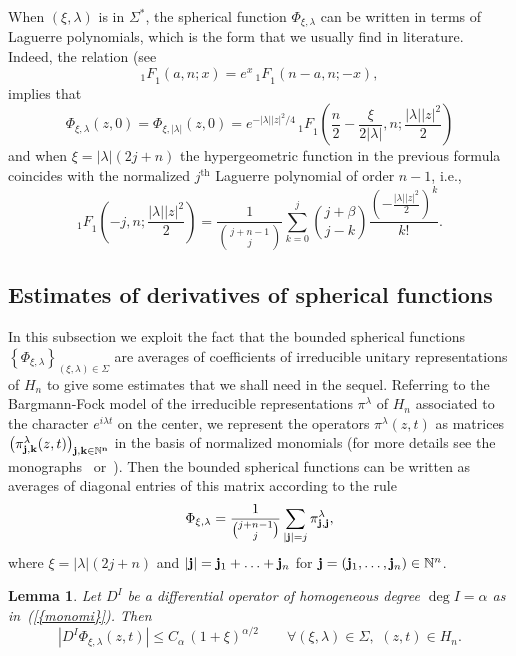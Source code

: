 \documentclass[12pt,a4paper]{amsart}
\theoremstyle{plain}
\newtheorem{lemma}[theorem]{Lemma}
\theoremstyle{definition}
\numberwithin{equation}{section}
\begin{document}
When $(\xi,{\lambda})$ is in ${{\Sigma^*}}$, the spherical function
$\Phi_{\xi,{\lambda}}$ can be written 
in terms of Laguerre polynomials, which is the form that we usually find in literature.
Indeed,  
the relation (see \cite[p.~253, formula~(7)]{E}
\begin{equation}\label{lebedev}
{ {_{1} F}_{\!1}}(a,{n};x)=e^x\, { {_{1} F}_{\!1}}({n}-a, {n};-x),
 \end{equation} 
implies that 
$$
\Phi_{\xi,{\lambda}}(z,0)
=\Phi_{\xi,|{\lambda}|}(z,0)=
e^{-|{\lambda}| |z|^2/4}\,
{ {_{1} F}_{\!1}} \left(\frac{n}{2}-\frac{\xi}{2 |{\lambda}|},{n};\frac{|{\lambda}| |z|^2}{2}\right)
$$
and when $\xi=|{\lambda}|(2j+{n})$ 
the hypergeometric function in the previous formula coincides with 
the normalized
   $j^{\text{th}}$ Laguerre polynomial
 of order ${n} -1$, i.e., 
 $$
 { {_{1} F}_{\!1}} \left(-j,{n};\frac{|{\lambda}| |z|^2}{2}\right) 
 =\frac1{\binom{j+ {n}-1}{j}}\sum_{k=0}^j \binom{j+\beta }{ j-k}
   \frac{(-\frac{|{\lambda}| |z|^2}{2})^k}{ k!}.
 $$
\medskip

\subsection{Estimates of derivatives of spherical functions}
In this subsection we exploit the fact that  the bounded  spherical functions 
$\left\{\Phi_{\xi,{\lambda}}\right\}_{(\xi,{\lambda})\in {\Sigma}}$  are averages of coefficients of irreducible 
unitary representations of ${{H_{n}}}$   
to give some estimates that we shall need in the sequel.
Referring to the Bargmann-Fock model 
of the irreducible representations $\pi^\lambda$ of $H_n$ 
associated to the character $e^{i\lambda t}$ on the center, 
we represent the operators $\pi^\lambda(z,t)$ as matrices 
$\big(\pi^\lambda_{\bf j,\bf k}(z,t)\big)_{\bf j, \bf k\in {\mathbb N}^{n}}$ 
in the basis of normalized monomials (for more details see the monographs~\cite{Folland}
or~\cite{Th}). Then the bounded spherical functions 
can be written as averages of
diagonal entries of this matrix   according to the rule
\begin{equation}\label{defPhi}
\Phi_{\xi,{\lambda}}=\frac1{\binom{j+ {n}-1}{j}}\sum_{|{\bf j}|=j}\pi^\lambda_{\bf j,\bf j},
\end{equation}
 where 
$\xi=|{\lambda}|(2j+{n})$ and $|{\bf j}|={\bf j}_1+\ldots +{\bf j}_n$ for $ {\bf j}  =\left({\bf j}_1, \ldots ,{\bf j}_n\right)\in {\mathbb N}^{n}$.

\begin{lemma}\label{stimasferiche} Let ${{D}}^I$ be a
differential operator of homogeneous degree $\deg I=  {\alpha}$ as in{~(\ref{{monomi}})}. Then  
$$
|{{D}}^I \Phi_{\xi,{\lambda}}(z,t)|\leq C_{\alpha}\, (1+\xi)^{{\alpha} /2}
\qquad\forall (\xi,{\lambda})\in {\Sigma},\,\, (z,t)\in {{H_{n}}}.
$$
 \end{lemma}
\end{document}
